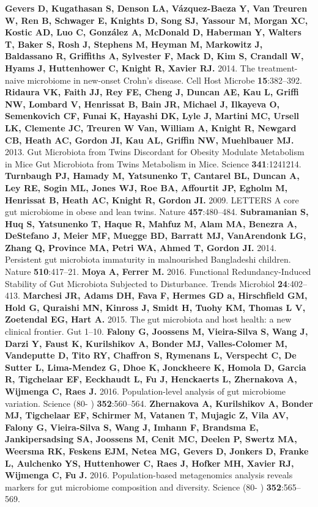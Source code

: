 \documentclass[12pt,oneside,letterpaper]{article}
\begin{document}
\begin{thebibliography}{99}
 {\bf Gevers D, Kugathasan S, Denson LA, Vázquez-Baeza Y, Van Treuren W, Ren B, Schwager E, Knights D, Song SJ, Yassour M, Morgan XC, Kostic AD, Luo C, González A, McDonald D, Haberman Y, Walters T, Baker S, Rosh J, Stephens M, Heyman M, Markowitz J, Baldassano R, Griffiths A, Sylvester F, Mack D, Kim S, Crandall W, Hyams J, Huttenhower C, Knight R, Xavier RJ.} 2014. The treatment-naive microbiome in new-onset Crohn’s disease. Cell Host Microbe {\bf 15}:382–392.
 {\bf Ridaura VK, Faith JJ, Rey FE, Cheng J, Duncan AE, Kau L, Griffi NW, Lombard V, Henrissat B, Bain JR, Michael J, Ilkayeva O, Semenkovich CF, Funai K, Hayashi DK, Lyle J, Martini MC, Ursell LK, Clemente JC, Treuren W Van, William A, Knight R, Newgard CB, Heath AC, Gordon JI, Kau AL, Griffin NW, Muehlbauer MJ.} 2013. Gut Microbiota from Twins Discordant for Obesity Modulate Metabolism in Mice Gut Microbiota from Twins Metabolism in Mice. Science {\bf 341}:1241214.
 {\bf Turnbaugh PJ, Hamady M, Yatsunenko T, Cantarel BL, Duncan A, Ley RE, Sogin ML, Jones WJ, Roe BA, Affourtit JP, Egholm M, Henrissat B, Heath AC, Knight R, Gordon JI.} 2009. LETTERS A core gut microbiome in obese and lean twins. Nature {\bf 457}:480–484.
 {\bf Subramanian S, Huq S, Yatsunenko T, Haque R, Mahfuz M, Alam MA, Benezra A, DeStefano J, Meier MF, Muegge BD, Barratt MJ, VanArendonk LG, Zhang Q, Province MA, Petri WA, Ahmed T, Gordon JI.} 2014. Persistent gut microbiota immaturity in malnourished Bangladeshi children. Nature {\bf 510}:417–21.
 {\bf Moya A, Ferrer M.} 2016. Functional Redundancy-Induced Stability of Gut Microbiota Subjected to Disturbance. Trends Microbiol {\bf 24}:402–413.
 {\bf Marchesi JR, Adams DH, Fava F, Hermes GD a, Hirschfield GM, Hold G, Quraishi MN, Kinross J, Smidt H, Tuohy KM, Thomas L V, Zoetendal EG, Hart A.} 2015. The gut microbiota and host health: a new clinical frontier. Gut 1–10.
 {\bf Falony G, Joossens M, Vieira-Silva S, Wang J, Darzi Y, Faust K, Kurilshikov A, Bonder MJ, Valles-Colomer M, Vandeputte D, Tito RY, Chaffron S, Rymenans L, Verspecht C, De Sutter L, Lima-Mendez G, Dhoe K, Jonckheere K, Homola D, Garcia R, Tigchelaar EF, Eeckhaudt L, Fu J, Henckaerts L, Zhernakova A, Wijmenga C, Raes J.} 2016. Population-level analysis of gut microbiome variation. Science (80- ) {\bf 352}:560–564.
 {\bf Zhernakova A, Kurilshikov A, Bonder MJ, Tigchelaar EF, Schirmer M, Vatanen T, Mujagic Z, Vila AV, Falony G, Vieira-Silva S, Wang J, Imhann F, Brandsma E, Jankipersadsing SA, Joossens M, Cenit MC, Deelen P, Swertz MA, Weersma RK, Feskens EJM, Netea MG, Gevers D, Jonkers D, Franke L, Aulchenko YS, Huttenhower C, Raes J, Hofker MH, Xavier RJ, Wijmenga C, Fu J.} 2016. Population-based metagenomics analysis reveals markers for gut microbiome composition and diversity. Science (80- ) {\bf 352}:565–569.

\end{thebibliography}
\end{document}
